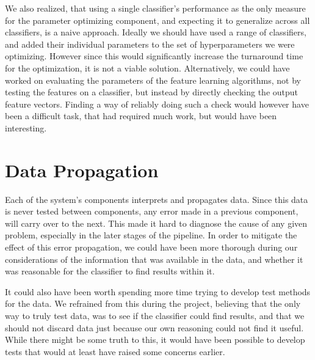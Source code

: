 We also realized, that using a single classifier's performance as the only measure for the parameter optimizing component, and expecting it to generalize across all classifiers, is a naive approach. Ideally we should have used a range of classifiers, and added their individual parameters to the set of hyperparameters we were optimizing. However since this would significantly increase the turnaround time for the optimization, it is not a viable solution. Alternatively, we could have worked on evaluating the parameters of the feature learning algorithms, not by testing the features on a classifier, but instead by directly checking the output feature vectors. Finding a way of reliably doing such a check would however have been a difficult task, that had required much work, but would have been interesting.

\section{Data Propagation}
Each of the system's components interprets and propagates data. Since this data is never tested between components, any error made in a previous component, will carry over to the next. This made it hard to diagnose the cause of any given problem, especially in the later stages of the pipeline. In order to mitigate the effect of this error propagation, we could have been more thorough during our considerations of the information that was available in the data, and whether it was reasonable for the classifier to find results within it.

It could also have been worth spending more time trying to develop test methods for the data. We refrained from this during the project, believing that the only way to truly test data, was to see if the classifier could find results, and that we should not discard data just because our own reasoning could not find it useful. While there might be some truth to this, it would have been possible to develop tests that would at least have raised some concerns earlier.



